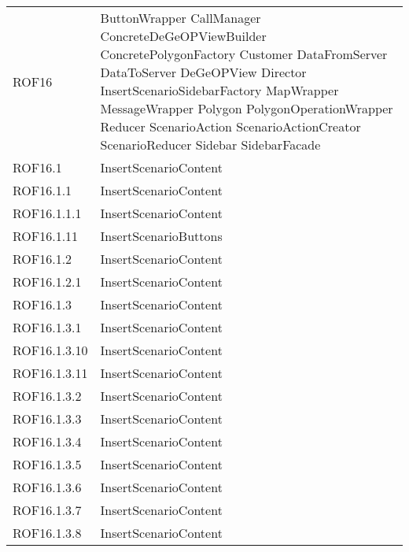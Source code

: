 \begin{longtable}{p{2.5cm}!{\VRule[1pt]}p{5cm}}
		ROF16 & ButtonWrapper \newline CallManager \newline ConcreteDeGeOPViewBuilder \newline ConcretePolygonFactory \newline Customer \newline DataFromServer \newline DataToServer \newline DeGeOPView \newline Director \newline InsertScenarioSidebarFactory \newline MapWrapper \newline MessageWrapper \newline Polygon \newline PolygonOperationWrapper \newline Reducer \newline ScenarioAction \newline ScenarioActionCreator \newline ScenarioReducer \newline Sidebar \newline SidebarFacade\\
		ROF16.1 & InsertScenarioContent\\
		ROF16.1.1 & InsertScenarioContent\\
		ROF16.1.1.1 & InsertScenarioContent\\
		ROF16.1.11 & InsertScenarioButtons\\
		ROF16.1.2 & InsertScenarioContent\\
		ROF16.1.2.1 & InsertScenarioContent\\
		ROF16.1.3 & InsertScenarioContent\\
		ROF16.1.3.1 & InsertScenarioContent\\
		ROF16.1.3.10 & InsertScenarioContent\\
		ROF16.1.3.11 & InsertScenarioContent\\
		ROF16.1.3.2 & InsertScenarioContent\\
		ROF16.1.3.3 & InsertScenarioContent\\
		ROF16.1.3.4 & InsertScenarioContent\\
		ROF16.1.3.5 & InsertScenarioContent\\
		ROF16.1.3.6 & InsertScenarioContent\\
		ROF16.1.3.7 & InsertScenarioContent\\
		ROF16.1.3.8 & InsertScenarioContent\\

\end{longtable}
